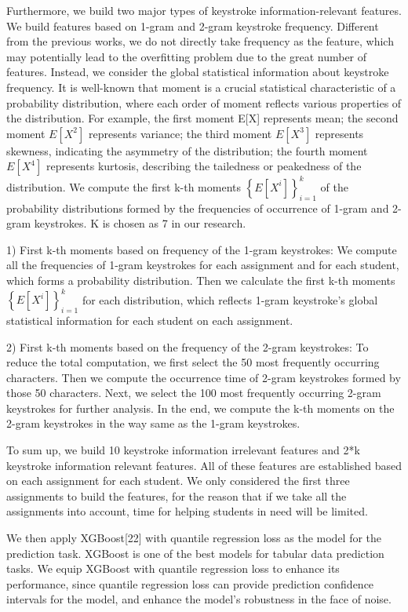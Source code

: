 \documentclass[sigconf,final]{acmart}
\begin{document}
Furthermore, we build two major types of keystroke information-relevant features. We build features based on 1-gram and 2-gram keystroke frequency. Different from the previous works, we do not directly take frequency as the feature, which may potentially lead to the overfitting problem due to the great number of features. Instead, we consider the global statistical information about keystroke frequency. It is well-known that moment is a crucial statistical characteristic of a probability distribution, where each order of moment reflects various properties of the distribution. For example, the first moment E[X] represents mean; the second moment $E[X^2]$ represents variance; the third moment $E[X^3]$ represents skewness, indicating the asymmetry of the distribution; the fourth moment $E[X^4]$ represents kurtosis, describing the tailedness or peakedness of the distribution. We compute the first k-th moments $\left\{ E[X^i] \right\}_{i=1}^k$  of the probability distributions formed by the frequencies of occurrence of 1-gram and 2-gram keystrokes. K is chosen as 7 in our research.


1) First k-th moments based on frequency of the 1-gram keystrokes: We compute all the frequencies of 1-gram keystrokes for each assignment and for each student, which forms a probability distribution. Then we calculate the first k-th moments $\left\{ E[X^i] \right\}_{i=1}^k$ for each distribution, which reflects 1-gram keystroke’s global statistical information for each student on each assignment.


2) First k-th moments based on the frequency of the 2-gram keystrokes: To reduce the total computation, we first select the 50 most frequently occurring characters. Then we compute the occurrence time of 2-gram keystrokes formed by those 50 characters. Next, we select the 100 most frequently occurring 2-gram keystrokes for further analysis. In the end, we compute the k-th moments on the 2-gram keystrokes in the way same as the 1-gram keystrokes.


To sum up, we build 10 keystroke information irrelevant features and 2*k keystroke information relevant features. All of these features are established based on each assignment for each student. We only considered the first three assignments to build the features, for the reason that if we take all the assignments into account, time for helping students in need will be limited.

We then apply XGBoost[22] with quantile regression loss as the model for the prediction task. XGBoost is one of the best models for tabular data prediction tasks. We equip XGBoost with quantile regression loss  to enhance its performance, since quantile regression loss can provide prediction confidence intervals for the model, and enhance the model's robustness in the face of noise. 
\end{document}
